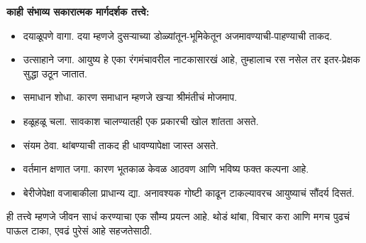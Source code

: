 \textbf{काही संभाव्य सकारात्मक मार्गदर्शक तत्त्वे:}
\begin{itemize}
\item दयाळूपणे वागा. दया म्हणजे दुसऱ्याच्या डोळ्यांतून-भूमिकेतून अजमावण्याची-पाहण्याची ताकद.
\item उत्साहाने जगा. आयुष्य हे एका रंगमंचावरील नाटकासारखं आहे, तुम्हालाच रस नसेल तर इतर-प्रेक्षक सुद्धा उठून जातात.
\item समाधान शोधा. कारण समाधान म्हणजे खऱ्या श्रीमंतीचं मोजमाप.
\item हळूहळू चला. सावकाश चालण्यातही एक प्रकारची खोल शांतता असते.
\item संयम ठेवा. थांबण्याची ताकद ही धावण्यापेक्षा जास्त असते.
\item वर्तमान क्षणात जगा. कारण भूतकाळ केवळ आठवण आणि भविष्य फक्त कल्पना आहे.
\item बेरीजेपेक्षा वजाबाकीला प्राधान्य द्या. अनावश्यक गोष्टी काढून टाकल्यावरच आयुष्याचं सौंदर्य दिसतं.
\end{itemize}

ही तत्त्वे म्हणजे जीवन साधं करण्याचा एक सौम्य प्रयत्न आहे. थोडं थांबा, विचार करा आणि मगच पुढचं पाऊल टाका, एवढं पुरेसं आहे सहजतेसाठी.
